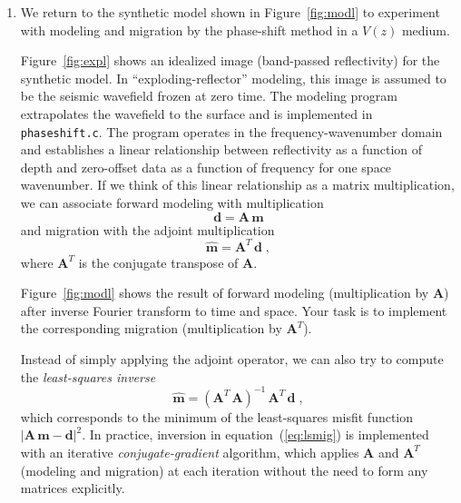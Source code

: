 \begin{enumerate}
\lstset{language=python,numbers=left,numberstyle=\tiny,showstringspaces=false}


\lstset{language=c,numbers=left,numberstyle=\tiny,showstringspaces=false}


\item  We return to the synthetic model shown in Figure~\ref{fig:modl} to experiment with  modeling and migration by the phase-shift method in a $V(z)$ medium. 

Figure~\ref{fig:expl} shows an idealized image (band-passed
reflectivity) for the synthetic model. In ``exploding-reflector''
modeling, this image is assumed to be the seismic wavefield frozen at
zero time. The modeling program extrapolates the wavefield to the
surface and is implemented in \texttt{phaseshift.c}. The program
operates in the frequency-wavenumber domain and establishes a linear
relationship between reflectivity as a function of depth and
zero-offset data as a function of frequency for one space wavenumber.
If we think of this linear relationship as a matrix multiplication, we
can associate forward modeling with multiplication\begin{equation}
\label{eq:mod}
\mathbf{d} = \mathbf{A}\,\mathbf{m}
\end{equation}
and migration with the adjoint multiplication
\begin{equation}
\label{eq:mig}
\widehat{\mathbf{m}} = \mathbf{A}^T\,\mathbf{d}\;,
\end{equation}
where $\mathbf{A}^T$ is the conjugate transpose of $\mathbf{A}$.

Figure~\ref{fig:modl} shows the result of forward modeling
(multiplication by $\mathbf{A}$) after inverse Fourier transform to
time and space. Your task is to implement the corresponding migration
(multiplication by $\mathbf{A}^T$). 

Instead of simply applying the adjoint operator, we can also try to compute
the \emph{least-squares inverse}
\begin{equation}
\label{eq:lsmig}
\widehat{\mathbf{m}} = \left(\mathbf{A}^T\,\mathbf{A}\right)^{-1}\,\mathbf{A}^T\,\mathbf{d}\;,
\end{equation}
which corresponds to the minimum of the least-squares misfit function
$|\mathbf{A}\,\mathbf{m}-\mathbf{d}|^2$. In practice, inversion in
equation~(\ref{eq:lsmig}) is implemented with an
iterative \emph{conjugate-gradient} algorithm, which applies
$\mathbf{A}$ and $\mathbf{A}^T$ (modeling and migration) at each
iteration without the need to form any matrices explicitly.


\end{enumerate}
